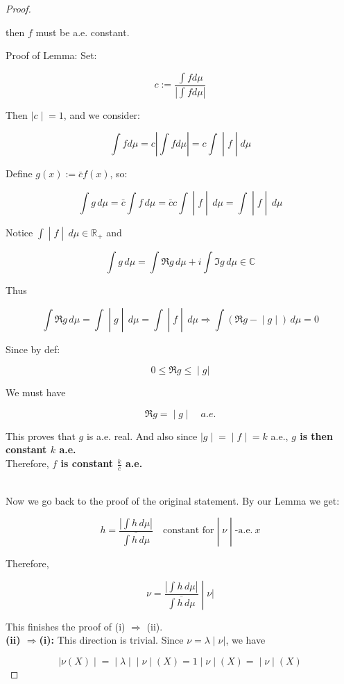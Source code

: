 \documentclass{qlnotes-export}
\begin{document}
\begin{proof}
\begin{lemma}
then \(f\) must be a.e. constant.

\end{lemma}

Proof of Lemma: Set:

\[c := \frac{\int fd\mu}{\left| {\int fd\mu} \right|}\]

Then \(\left. |c \middle| = 1 \right.\), and we consider:

\[\left. \int fd\mu = c\left| {\int fd\mu} \right| = c\int \middle| f \middle| d\mu \right.\]

Define \(g(x) := \bar{c}f(x)\), so:

\[\left. \int g\, d\mu = \bar{c}\int f\, d\mu = \bar{c}c\int \middle| f \middle| \, d\mu = \int \middle| f \middle| \, d\mu \right.\]

Notice \(\left. \int \middle| f \middle| \, d\mu \in {\mathbb{R}}_{+} \right.\) and

\[\int g\, d\mu = \int\Re g\, d\mu + i\int\Im g\, d\mu \in {\mathbb{C}}\]

Thus

\[\left. \int\Re g\, d\mu = \int \middle| g \middle| \, d\mu = \int \middle| f \middle| \, d\mu\Longrightarrow\int(\Re g - \middle| g \middle| )\, d\mu = 0 \right.\]

Since by def:

\[\left. 0 \leq \Re g \leq \middle| g| \right.\]

We must have

\[\left. \Re g = \middle| g \middle| \quad a.e. \right.\]

This proves that \(g\) is a.e. real. And also since \(\left. |g \middle| = \middle| f \middle| = k \right.\) a.e., \textbf{\(g\) is then constant \(k\) a.e.}\\
Therefore, \textbf{\(f\) is constant \(\frac{k}{\bar{c}}\) a.e.}\\
\strut \\
Now we go back to the proof of the original statement. By our Lemma we get:

\[\left. h = \frac{\left| {\int h\, d\mu} \right|}{\bar{\int h\, d\mu}}\quad\text{constant for} \middle| \nu \middle| \text{-a.e.}\ x \right.\]

Therefore,

\[\left. \nu = \frac{\left| {\int h\, d\mu} \right|}{\bar{\int h\, d\mu}} \middle| \nu| \right.\]

This finishes the proof of (i) \(\Longrightarrow\) (ii).\\
\textbf{(ii) \(\Longrightarrow\)(i):} This direction is trivial. Since \(\left. \nu = \lambda \middle| \nu| \right.\), we have

\[\left. |\nu(X) \middle| = \middle| \lambda \middle| \middle| \nu \middle| (X) = 1 \middle| \nu \middle| (X) = \middle| \nu \middle| (X) \right.\]

\end{proof}
\end{document}
